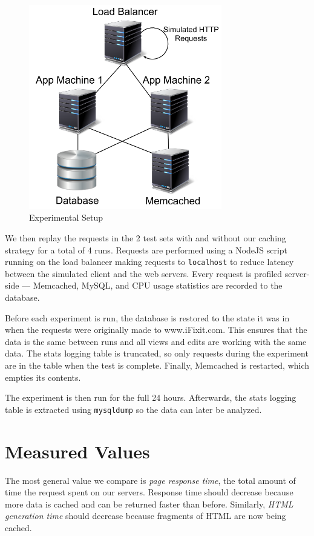 \documentclass[12pt]{ucthesis}
\begin{document}
\begin{figure}[h]
\centering
\includegraphics[width=0.75\textwidth]{assets/experimentalArchitecture.png}
\caption{Experimental Setup}
\label{fig:experimentalArchitecture}
\end{figure}

We then replay the requests in the 2 test sets with and without our caching strategy for a total of 4 runs.
Requests are performed using a NodeJS script running on the load balancer making requests to {\tt localhost} to reduce latency between the simulated client and the web servers.
Every request is profiled server-side --- \textsf{Memcached}, \textsf{MySQL}, and CPU usage statistics are recorded to the database.

Before each experiment is run, the database is restored to the state it was in when the requests were originally made to \textsf{www.iFixit.com}.
This ensures that the data is the same between runs and all views and edits are working with the same data.
The stats logging table is truncated, so only requests during the experiment are in the table when the test is complete.
Finally, \textsf{Memcached} is restarted, which empties its contents.

The experiment is then run for the full 24 hours.
Afterwards, the stats logging table is extracted using {\tt mysqldump} so the data can later be analyzed.

\section{Measured Values}
The most general value we compare is \textit{page response time}, the total amount of time the request spent on our servers.
Response time should decrease because more data is cached and can be returned faster than before.
Similarly, \textit{HTML generation time} should decrease because fragments of HTML are now being cached.
\end{document}
